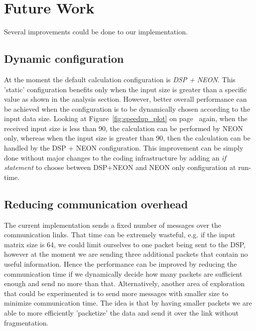 \section{Future Work}
Several improvements could be done to our implementation.

\subsection{Dynamic configuration}

At the moment the default calculation configuration is \emph{DSP + NEON}.
This 'static' configuration benefits only when the input size is greater than a specific value as shown in the analysis section.
However, better overall performance can be achieved when the 
configuration is to be dynamically chosen according to the input data size.
Looking at Figure~\ref{fig:speedup_plot} on page~\pageref{fig:speedup_plot} again, when the received input size is less than 90, the calculation can be performed by NEON only,
whereas when the input size is greater than 90, then the calculation can be handled by the DSP + NEON configuration. This improvement can be simply done without major changes to the coding infrastructure by adding an \textit{if statement} to choose between DSP+NEON and NEON only configuration at run-time.

\subsection{Reducing communication overhead}

The current implementation sends a fixed number of messages over the communication links. That time can be extremely wasteful, e.g. if the input matrix size is 64, we could limit ourselves to one packet being sent to the DSP, 
however at the moment we are sending three additional packets that contain no useful information. Hence the performance can be improved by reducing the communication time if we dynamically decide how many packets are sufficient enough and send no more than that.
Alternatively, 
another area of exploration that could be experimented is to send more messages with smaller size to minimize communication time. The idea is that by having smaller packets we are able to more efficiently 'packetize' the data and send it over the link without fragmentation.